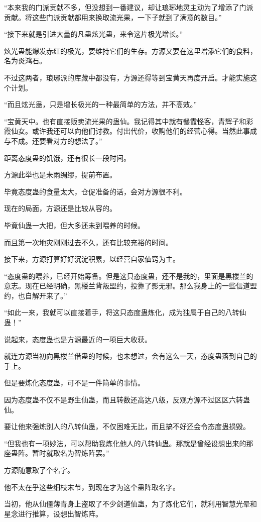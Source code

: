 \begin{this_body}
“本来我的门派贡献不多，但没想到一番建议，却让琅琊地灵主动为了增添了门派贡献。将这些门派贡献都用来换取流光果，一下子就到了满意的数目。”

“接下来就是引进大量的凡蛊炫光蛊，来令这片极光增长。”

炫光蛊能爆发赤红的极光，要维持它们的生存。方源又要在这里增添它们的食料，名为炎鸿石。

不过这两者，琅琊派的库藏中都没有，方源还得等到宝黄天再度开启。才能实施这个计划。

“而且炫光蛊，只是增长极光的一种最简单的方法，并不高效。”

“宝黄天中。也有直接贩卖流光果的蛊仙。我记得其中就有餐霞怪客，青辉子和彩霞仙女。或许我还可以向他们讨教。付出代价，收购他们的经营心得。当然此事成与不成。还要看对方的想法了。”

距离态度蛊的饥饿，还有很长一段时间。

方源此举也是未雨绸缪，提前布置。

毕竟态度蛊的食量太大，仓促准备的话，会对方源很不利。

现在的局面，方源还是比较从容的。

毕竟仙蛊一大把，但大多还未到喂养的时候。

而且第一次地灾刚刚过去不久，还有比较充裕的时间。

接下来，方源打算好好沉淀积累，以经营自家仙窍为主。

“态度蛊的喂养，已经开始筹备。但是这只态度蛊，还不是我的，里面是黑楼兰的意志。现在已经明确，黑楼兰背叛盟约，投靠了影无邪。那么我身上的一些信道盟约，也自解开来了。”

“如此一来，我就可以直接着手，将这只态度蛊炼化，成为独属于自己的八转仙蛊！”

说起来，态度蛊也是方源最近的一项巨大收获。

就连方源当初向黑楼兰借蛊的时候，也未想过，会有这么一天，态度蛊落到自己的手上。

但是要炼化态度蛊，可不是一件简单的事情。

因为态度蛊不仅不是野生仙蛊，而且转数还高达八级，反观方源不过区区六转蛊仙。

要让他来强炼别人的八转仙蛊，不仅困难无比，而且搞不好还会令态度蛊损毁。

“但我也有一项妙法，可以帮助我炼化他人的八转仙蛊。那就是曾经设想出来的那座蛊阵。暂时就取名为智炼阵罢。”

方源随意取了个名字。

他不太在乎这些细枝末节，到现在才为这个蛊阵取名字。

当初，他从仙僵薄青身上盗取了不少剑道仙蛊，为了炼化它们，就利用智慧光晕和星念进行推算，设想出智炼阵。


\end{this_body}
